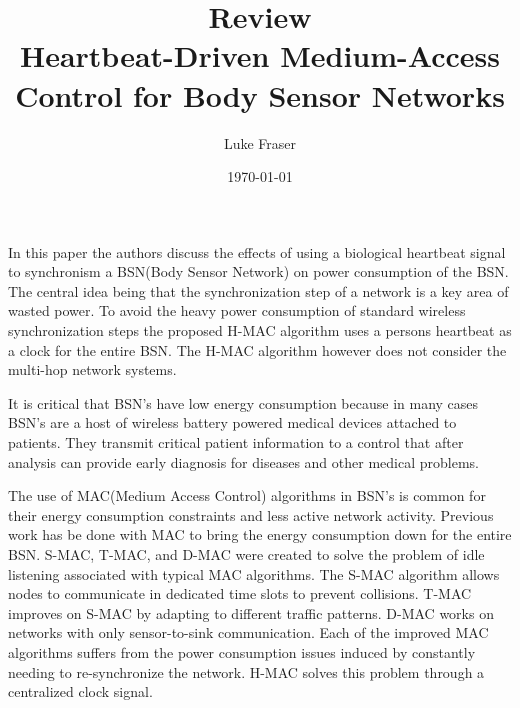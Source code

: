 \documentclass{article}
\begin{document}
\title{{\large Review} \\ Heartbeat-Driven Medium-Access Control for Body Sensor Networks}
\author{Luke Fraser}
\date{\today}
\maketitle

\begingroup
\renewcommand{\section}[2]{}


\endgroup

\section*{Paper Overview}
In this paper the authors discuss the effects of using a biological heartbeat signal to synchronism a BSN(Body Sensor Network) on power consumption of the BSN. The central idea being that the synchronization step of a network is a key area of wasted power. To avoid the heavy power consumption of standard wireless synchronization steps the proposed H-MAC algorithm uses a persons heartbeat as a clock for the entire BSN. The H-MAC algorithm however does not consider the multi-hop network systems.

It is critical that BSN's have low energy consumption because in many cases BSN's are a host of wireless battery powered medical devices attached to patients. They transmit critical patient information to a control that after analysis can provide early diagnosis for diseases and other medical problems.

The use of MAC(Medium Access Control) algorithms in BSN's is common for their energy consumption constraints and less active network activity. Previous work has be done with MAC to bring the energy consumption down for the entire BSN. S-MAC, T-MAC, and D-MAC were created to solve the problem of idle listening associated with typical MAC algorithms. The S-MAC algorithm allows nodes to communicate in dedicated time slots to prevent collisions. T-MAC improves on S-MAC by adapting to different traffic patterns. D-MAC works on networks with only sensor-to-sink communication. Each of the improved MAC algorithms suffers from the power consumption issues induced by constantly needing to re-synchronize the network. H-MAC solves this problem through a centralized clock signal.
\end{document}
